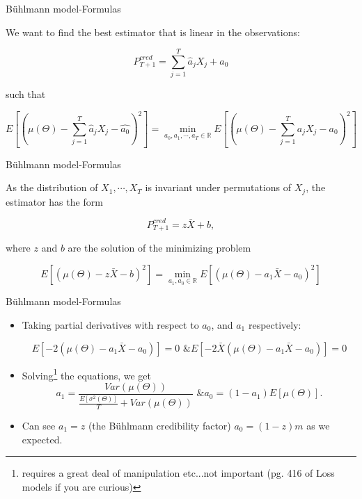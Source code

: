\documentclass[11pt]{beamer}
\begin{document}
\begin{frame}{B\"uhlmann model-Formulas}

We want to find the best estimator that is linear in the observations:

$$P_{T+1}^{cred}=\sum_{j=1}^T \hat{a}_j X_j + \hat{a}_0$$

such that

$$ E[(\mu(\Theta)-\sum_{j=1}^T \hat{a}_j X_j -\hat{a_0})^2]=\min_{a_0,a_1,\cdots,a_T\in \mathbb{R}}E[(\mu(\Theta)-\sum_{j=1}^T {a}_j X_j -{a_0})^2] $$


\end{frame}
\begin{frame}{B\"uhlmann model-Formulas}

As the distribution of $X_1,\cdots,X_T$ is invariant under permutations of $X_j$, the estimator has the form

$$P_{T+1}^{cred}=z \bar{X} + b,$$

\vspace{0.5 cm}

where $z$ and $b$ are the solution of the minimizing problem

\vspace{0.5 cm}

$$ E[(\mu(\Theta)- z \bar{X} -b)^2]=\min_{a_1,a_0\in \mathbb{R}}E[(\mu(\Theta)-a_1\bar{X} -{a_0})^2] $$ 

\end{frame}
\begin{frame}{B\"uhlmann model-Formulas}

\begin{itemize}
\item
Taking partial derivatives with respect to $a_0$, and $a_1$ respectively:

$$ E[-2(\mu(\Theta)- a_1 \bar{X} -{a_0})]=0 \text{  \&  } E[-2\bar{X}(\mu(\Theta)-a_1\bar{X} -{a_0})]=0$$

\item Solving\footnote{requires a great deal of manipulation etc...not important (pg. 416 of Loss models if you are curious)} the  equations, we get
$$a_1=\frac{Var(\mu(\Theta))}{\frac{E[\sigma^2(\Theta)]}{T}+Var(\mu(\Theta))} \text{  \&  } a_0=(1-a_1)E[\mu(\Theta)].$$

\item Can see $a_1 = z$ (the B\"uhlmann credibility factor) $a_0 = (1-z)m$ as we expected.

\end{itemize}

\end{frame}
\end{document}
